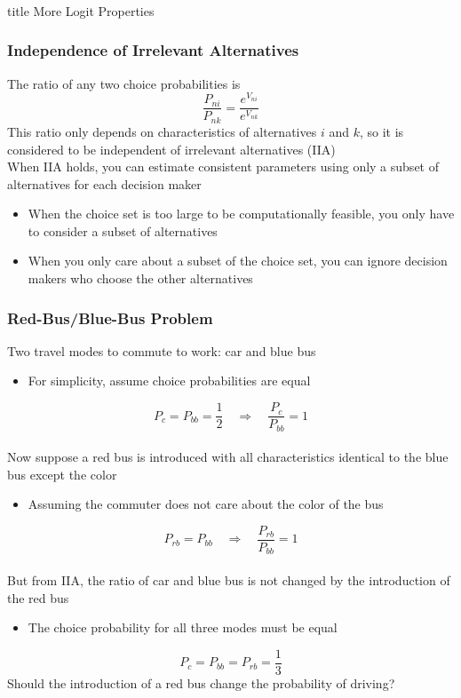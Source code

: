 \documentclass{beamer}
\begin{document}
\begin{frame}\frametitle{}
    \vfill
    \centering
    \begin{beamercolorbox}[center]{title}
        \Large More Logit Properties
    \end{beamercolorbox}
    \vfill
\end{frame}

\begin{frame}\frametitle{Independence of Irrelevant Alternatives}
    The ratio of any two choice probabilities is
    $$\frac{P_{ni}}{P_{nk}} = \frac{e^{V_{ni}}}{e^{V_{nk}}}$$
    This ratio only depends on characteristics of alternatives $i$ and $k$, so it is considered to be independent of irrelevant alternatives (IIA) \\
    \vspace{3ex}
    When IIA holds, you can estimate consistent parameters using only a subset of alternatives for each decision maker
    \begin{itemize}
    	\item When the choice set is too large to be computationally feasible, you only have to consider a subset of alternatives
    	\item When you only care about a subset of the choice set, you can ignore decision makers who choose the other alternatives
    \end{itemize}
\end{frame}

\begin{frame}\frametitle{Red-Bus/Blue-Bus Problem}
    Two travel modes to commute to work: car and blue bus
    \begin{itemize}
    	\item For simplicity, assume choice probabilities are equal
    \end{itemize}
    $$P_c = P_{bb} = \frac{1}{2} \quad \Rightarrow \quad \frac{P_c}{P_{bb}} = 1$$ \\
    Now suppose a red bus is introduced with all characteristics identical to the blue bus except the color
    \begin{itemize}
    	\item Assuming the commuter does not care about the color of the bus
    \end{itemize}
    $$P_{rb} = P_{bb} \quad \Rightarrow \quad \frac{P_{rb}}{P_{bb}} = 1$$ \\
    But from IIA, the ratio of car and blue bus is not changed by the introduction of the red bus
    \begin{itemize}
    	\item The choice probability for all three modes must be equal
    \end{itemize}
    $$P_c = P_{bb} = P_{rb} = \frac{1}{3}$$
    Should the introduction of a red bus change the probability of driving?
\end{frame}
\end{document}
